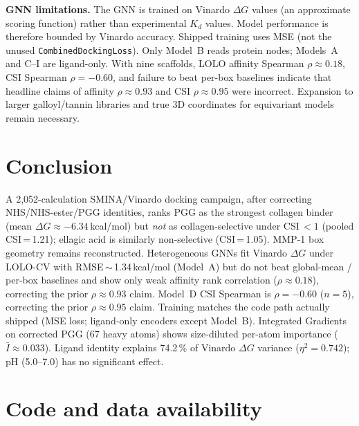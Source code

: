 \documentclass[11pt]{article}
\begin{document}
\textbf{GNN limitations.}  The GNN is trained on Vinardo $\Delta G$ values
(an approximate scoring function) rather than experimental $K_{d}$ values.
Model performance is therefore bounded by Vinardo accuracy.
Shipped training uses MSE (not the unused \texttt{CombinedDockingLoss}).
Only Model~B reads protein nodes; Models~A and C--I are ligand-only.
With nine scaffolds, LOLO affinity Spearman $\rho \approx 0.18$, CSI
Spearman $\rho = -0.60$, and failure to beat per-box baselines indicate
that headline claims of affinity $\rho \approx 0.93$ and CSI $\rho \approx 0.95$
were incorrect.
Expansion to larger galloyl/tannin libraries and true 3D coordinates for
equivariant models remain necessary.


\section{Conclusion}
\label{sec:conclusion}

A 2{,}052-calculation SMINA/Vinardo docking campaign, after correcting
NHS/NHS-ester/PGG identities, ranks PGG as the strongest collagen binder
(mean $\Delta G \approx -6.34$\,kcal/mol) but \emph{not} as
collagen-selective under CSI\,$< 1$ (pooled CSI\,=\,1.21); ellagic acid
is similarly non-selective (CSI\,=\,1.05).
MMP-1 box geometry remains reconstructed.
Heterogeneous GNNs fit Vinardo $\Delta G$ under LOLO-CV with
RMSE\,$\sim$\,1.34\,kcal/mol (Model~A) but do not beat global-mean /
per-box baselines and show only weak affinity rank correlation
($\rho \approx 0.18$), correcting the prior $\rho \approx 0.93$ claim.
Model~D CSI Spearman is $\rho = -0.60$ ($n{=}5$), correcting the prior
$\rho \approx 0.95$ claim.
Training matches the code path actually shipped (MSE loss; ligand-only
encoders except Model~B).
Integrated Gradients on corrected PGG (67 heavy atoms) shows
size-diluted per-atom importance ($\bar{I} \approx 0.033$).
Ligand identity explains 74.2\,\% of Vinardo $\Delta G$ variance
($\eta^{2} = 0.742$); pH (5.0--7.0) has no significant effect.


\section*{Code and data availability}
\end{document}
